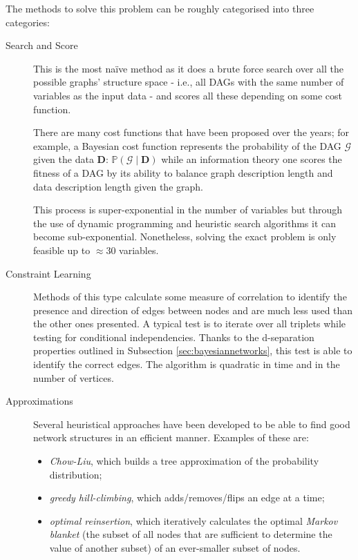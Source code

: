 The methods to solve this problem can be roughly categorised into three categories:
\begin{description}
	\item[Search and Score] This is the most na{\"i}ve method as it does a brute force search over all the possible graphs' structure space - i.e., all DAGs with the same number of variables as the input data - and scores all these depending on some cost function.
	
	There are many cost functions that have been proposed over the years; for example, a Bayesian cost function represents the probability of the DAG $\mathcal{G}$ given the data $\boldsymbol{D}$: $\mathbb{P}(\mathcal{G} \mid \boldsymbol{D})$ while an information theory one scores the fitness of a DAG by its ability to balance graph description length and data description length given the graph. 
	
		This process is super-exponential in the number of variables but through the use of dynamic programming and heuristic search algorithms it can become sub-exponential.
		Nonetheless, solving the exact problem is only feasible up to $\approx 30$ variables.
		
	\item[Constraint Learning] Methods of this type calculate some measure of correlation to identify the presence and direction of edges between nodes and are much less used than the other ones presented.
		A typical test is to iterate over all triplets while testing for conditional independencies.
		Thanks to the d-separation properties outlined in Subsection \ref{sec:bayesiannetworks}, this test is able to identify the correct edges.
		The algorithm is quadratic in time and in the number of vertices.
		
	\item[Approximations] Several heuristical approaches have been developed to be able to find good network structures in an efficient manner.
		Examples of these are:
		\begin{itemize}
		  \item \textit{Chow-Liu}, which builds a tree approximation of the probability distribution;
		  \item \textit{greedy hill-climbing}, which adds/removes/flips an edge at a time;
		  \item \textit{optimal reinsertion}, which iteratively calculates the optimal \textit{Markov blanket} (the subset of all nodes that are sufficient to determine the value of another subset) of an ever-smaller subset of nodes.
		\end{itemize}
\end{description}


